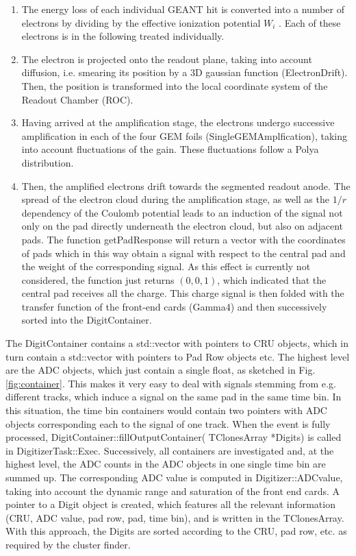 \documentclass[12pt,DIV=14,parskip=half]{scrartcl}
\begin{document}
\begin{enumerate}
\item The energy loss of each individual GEANT hit is converted into a number of electrons by dividing by the effective ionization potential $W_i$ . Each of these electrons is in the following treated individually.

\item The electron is projected onto the readout plane, taking into account diffusion, i.e. smearing its position by a 3D gaussian function (ElectronDrift). Then, the position is transformed into the local coordinate system of the Readout Chamber (ROC).

\item Having arrived at the amplification stage, the electrons undergo successive amplification in each of the four GEM foils (SingleGEMAmplfication), taking into account fluctuations of the gain. These fluctuations follow a Polya distribution.

\item Then, the amplified electrons drift towards the segmented readout anode. The spread of the electron cloud during the amplification stage, as well as the $1/r$ dependency of the Coulomb potential leads to an induction of the signal not only on the pad directly underneath the electron cloud, but also on adjacent pads. The function getPadResponse will return a vector with the coordinates of pads which in this way obtain a signal with respect to the central pad and the weight of the corresponding signal. As this effect is currently not considered, the function just returns $(0, 0, 1)$, which indicated that the central pad receives all the charge.
This charge signal is then folded with the transfer function of the front-end cards (Gamma4) and then successively sorted into the DigitContainer. 
\end{enumerate}

The DigitContainer contains a std::vector with pointers to CRU objects, which in turn contain a std::vector with pointers to Pad Row objects etc. The highest level are the ADC objects, which just contain a single float, as sketched in Fig. \ref{fig:container}.
This makes it very easy to deal with signals stemming from e.g. different tracks, which induce a signal on the same pad in the same time bin. In this situation, the time bin containers would contain two pointers with ADC objects corresponding each to the signal of one track.
When the event is fully processed, DigitContainer::fillOutputContainer( TClonesArray *Digits) is called in DigitizerTask::Exec. Successively, all containers are investigated and, at the highest level, the ADC counts in the ADC objects in one single time bin are summed up. The corresponding ADC value is computed in Digitizer::ADCvalue, taking into account the dynamic range and saturation of the front end cards. 
A pointer to a Digit object is created, which features all the relevant information (CRU, ADC value, pad row, pad, time bin), and is written in the TClonesArray. With this approach, the Digits are sorted according to the CRU, pad row, etc. as required by the cluster finder.
\end{document}
